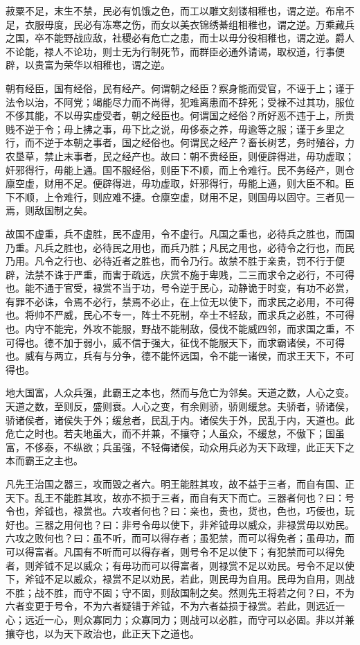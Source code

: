\documentclass[]{article}
\begin{document}
菽粟不足，末生不禁，民必有饥饿之色，而工以雕文刻镂相稚也，谓之逆。布帛不足，衣服毋度，民必有冻寒之伤，而女以美衣锦绣綦组相稚也，谓之逆。万乘藏兵之国，卒不能野战应敌，社稷必有危亡之患，而士以毋分役相稚也，谓之逆。爵人不论能，禄人不论功，则士无为行制死节，而群臣必通外请谒，取权道，行事便辟，以贵富为荣华以相稚也，谓之逆。

朝有经臣，国有经俗，民有经产。何谓朝之经臣？察身能而受官，不诬于上；谨于法令以治，不阿党；竭能尽力而不尚得，犯难离患而不辞死；受禄不过其功，服位不侈其能，不以毋实虚受者，朝之经臣也。何谓国之经俗？所好恶不违于上，所贵贱不逆于令；毋上拂之事，毋下比之说，毋侈泰之养，毋逾等之服；谨于乡里之行，而不逆于本朝之事者，国之经俗也。何谓民之经产？畜长树艺，务时殖谷，力农垦草，禁止末事者，民之经产也。故曰：朝不贵经臣，则便辟得进，毋功虚取；奸邪得行，毋能上通。国不服经俗，则臣下不顺，而上令难行。民不务经产，则仓廪空虚，财用不足。便辟得进，毋功虚取，奸邪得行，毋能上通，则大臣不和。臣下不顺，上令难行，则应难不捷。仓廪空虚，财用不足，则国毋以固守。三者见一焉，则敌国制之矣。

故国不虚重，兵不虚胜，民不虚用，令不虚行。凡国之重也，必待兵之胜也，而国乃重。凡兵之胜也，必待民之用也，而兵乃胜；凡民之用也，必待令之行也，而民乃用。凡令之行也、必待近者之胜也，而令乃行。故禁不胜于亲贵，罚不行于便辟，法禁不诛于严重，而害于疏远，庆赏不施于卑贱，二三而求令之必行，不可得也。能不通于官受，禄赏不当于功，号令逆于民心，动静诡于时变，有功不必赏，有罪不必诛，令焉不必行，禁焉不必止，在上位无以使下，而求民之必用，不可得也。将帅不严威，民心不专一，阵士不死制，卒士不轻敌，而求兵之必胜，不可得也。内守不能完，外攻不能服，野战不能制敌，侵伐不能威四邻，而求国之重，不可得也。德不加于弱小，威不信于强大，征伐不能服天下，而求霸诸侯，不可得也。威有与两立，兵有与分争，德不能怀远国，令不能一诸侯，而求王天下，不可得也。

地大国富，人众兵强，此霸王之本也，然而与危亡为邻矣。天道之数，人心之变。天道之数，至则反，盛则衰。人心之变，有余则骄，骄则缓怠。夫骄者，骄诸侯，骄诸侯者，诸侯失于外；缓怠者，民乱于内。诸侯失于外，民乱于内，天道也。此危亡之时也。若夫地虽大，而不并兼，不攘夺；人虽众，不缓怠，不傲下；国虽富，不侈泰，不纵欲；兵虽强，不轻侮诸侯，动众用兵必为天下政理，此正天下之本而霸王之主也。

凡先王治国之器三，攻而毁之者六。明王能胜其攻，故不益于三者，而自有国、正天下。乱王不能胜其攻，故亦不损于三者，而自有天下而亡。三器者何也？曰：号令也，斧钺也，禄赏也。六攻者何也？曰：亲也，贵也，货也，色也，巧佞也，玩好也。三器之用何也？曰：非号令毋以使下，非斧钺毋以威众，非禄赏毋以劝民。六攻之败何也？曰：虽不听，而可以得存者；虽犯禁，而可以得免者；虽毋功，而可以得富者。凡国有不听而可以得存者，则号令不足以使下；有犯禁而可以得免者，则斧钺不足以威众；有毋功而可以得富者，则禄赏不足以劝民。号令不足以使下，斧钺不足以威众，禄赏不足以劝民，若此，则民毋为自用。民毋为自用，则战不胜；战不胜，而守不固；守不固，则敌国制之矣。然则先王将若之何？曰，不为六者变更于号令，不为六者疑错于斧钺，不为六者益损于禄赏。若此，则远近一心；远近一心，则众寡同力；众寡同力；则战可以必胜，而守可以必固。非以并兼攘夺也，以为天下政治也，此正天下之道也。
\end{document}
